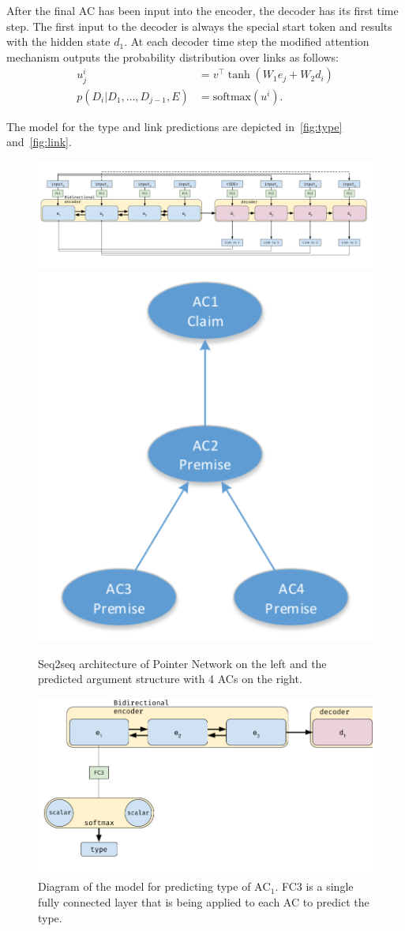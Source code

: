 \documentclass[onecolumn]{article}
\begin{document}
After the final AC has been input into the encoder, the decoder has its first time step.
The first input to the decoder is always the special start token and results with the hidden state $d_1$.
At each decoder time step the modified attention mechanism outputs the probability distribution over links as follows:
\begin{align*}
    u_j^i &= v^\top \tanh(W_1e_j + W_2d_i)\\
    p(D_i|D_1,\dots,D_{j-1},E) &= \text{softmax}(u^i).
\end{align*}

The model for the type and link predictions are depicted in~\autoref{fig:type} and~\ref{fig:link}.

\begin{figure}[h]
    \centering
    \includegraphics[width=0.8\linewidth]{fig/seq2seq.png}
    \includegraphics[width=0.18\linewidth]{fig/acs.png}
    \caption{Seq2seq architecture of Pointer Network on the left and the predicted argument structure with 4 ACs on the right.}\label{fig:seq2seq}
\end{figure}

\begin{figure}[h]
    \centering
    \includegraphics[width=0.8\linewidth]{fig/type.png}
    \caption{Diagram of the model for predicting type of $\text{AC}_1$. FC3 is a single fully connected layer that is being applied to each AC to predict the type.}\label{fig:type}
\end{figure}
\end{document}
